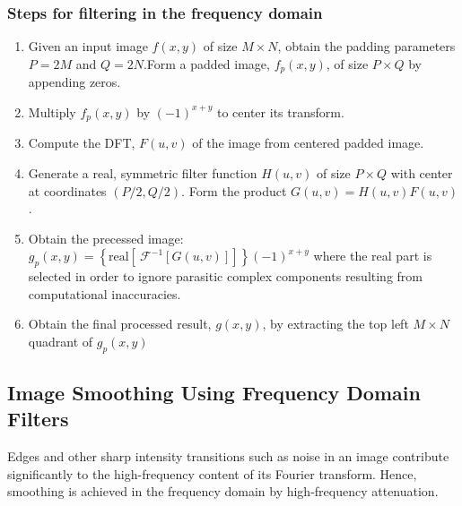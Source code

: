 \subsubsection{Steps for filtering in the frequency domain}
\begin{enumerate}
	\item Given an input image $f(x,y)$ of size $M\times N$, obtain the padding parameters $P=2M$ and $Q=2N$.Form a padded image, $f_p(x,y)$, of size $P\times Q$ by appending zeros.
	\item Multiply $f_p(x,y)$ by $(-1)^{x+y}$ to center its transform.
	\item Compute the DFT, $F(u,v)$ of the image from centered padded image.
	\item Generate a real, symmetric filter function $H(u,v)$ of size $P \times Q$ with center at coordinates $(P/2, Q/2)$. Form the product $G(u,v)=H(u,v)F(u,v)$.
	\item Obtain the precessed image: $g_p(x,y)=\left\{ \text{real}\left[\ \mathcal{F}^{-1}[G(u,v)] \right] \right\}(-1)^{x+y}$ where the real part is selected in order to ignore parasitic complex components resulting from computational inaccuracies.
	\item Obtain the final processed result, $g(x,y)$, by extracting the top left $M\times N$ quadrant of $g_p(x,y)$
\end{enumerate}


\subsection{Image Smoothing Using Frequency Domain Filters}
Edges and other sharp intensity transitions such as noise in an image contribute significantly to the high-frequency content of its Fourier transform. Hence, smoothing is achieved in the frequency domain by high-frequency attenuation.
